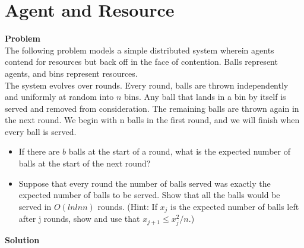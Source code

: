 	\section{Agent and Resource}
	\textbf{Problem}\\
	The following problem models a simple distributed system wherein agents contend for resources but back off in the face of contention. Balls represent agents, and bins represent resources.\\
	The system evolves over rounds. Every round, balls are thrown independently and uniformly at random into $n$ bins. Any ball that lands in a bin by itself is served and removed from consideration. The remaining balls are thrown again in the next round. We begin with n balls in the first round, and we will finish when every ball is served.
	\begin{itemize}
		\item If there are $b$ balls at the start of a round, what is the expected number of balls at the start of the next round?
		\item Suppose that every round the number of balls served was exactly the expected number of balls to be served. Show that all the balls would be served in $O(ln ln n)$ rounds. (Hint: If $x_j$ is the expected number of balls left after j rounds, show and use that $x_{j+1} \le x^2_j/n$.)
	\end{itemize}
	\textbf{Solution}\\
